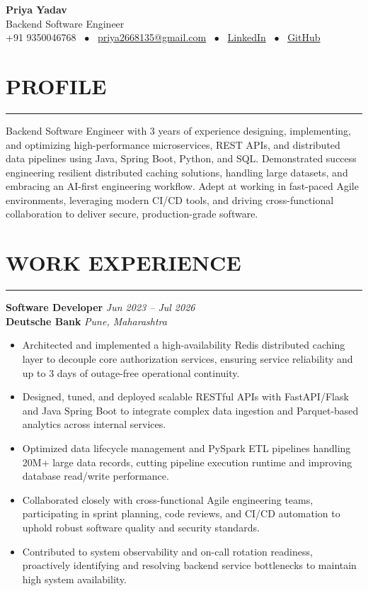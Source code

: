 \documentclass[11pt,letterpaper]{article}
\newcommand{\sectionrule}{\vspace{-6pt}\hrule\vspace{3pt}}
\newcommand{\entryHeader}[4]{%
  \textbf{#1} \hfill \textit{#2}\\
  \textbf{#3} \hfill \textit{#4}
}
\newenvironment{entryList}{%
  \begin{itemize}[leftmargin=1.3em, itemsep=1.5pt, topsep=2pt, parsep=0pt]
}{%
  \end{itemize}\vspace{2pt}
}
\begin{document}
\begin{center}
  {\LARGE \bfseries Priya Yadav} \\[2pt]
  {\normalsize Backend Software Engineer} \\[2pt]
  \small +91 9350046768 ~$\bullet$~
  \href{mailto:priya2668135@gmail.com}{priya2668135@gmail.com} ~$\bullet$~
  \href{https://www.linkedin.com/in/priya-yadav-14a44419a/}{LinkedIn} ~$\bullet$~
  \href{https://github.com/precise-charmerr}{GitHub}
\end{center}

\vspace{2pt}

\section*{PROFILE}
\sectionrule
Backend Software Engineer with 3 years of experience designing, implementing, and optimizing high-performance microservices, REST APIs, and distributed data pipelines using Java, Spring Boot, Python, and SQL. Demonstrated success engineering resilient distributed caching solutions, handling large datasets, and embracing an AI-first engineering workflow. Adept at working in fast-paced Agile environments, leveraging modern CI/CD tools, and driving cross-functional collaboration to deliver secure, production-grade software.

\section*{WORK EXPERIENCE}
\sectionrule

\entryHeader{Software Developer}{Jun 2023 -- Jul 2026}{Deutsche Bank}{Pune, Maharashtra}
\begin{entryList}
  \item Architected and implemented a high-availability Redis distributed caching layer to decouple core authorization services, ensuring service reliability and up to 3 days of outage-free operational continuity.
  \item Designed, tuned, and deployed scalable RESTful APIs with FastAPI/Flask and Java Spring Boot to integrate complex data ingestion and Parquet-based analytics across internal services.
  \item Optimized data lifecycle management and PySpark ETL pipelines handling 20M+ large data records, cutting pipeline execution runtime and improving database read/write performance.
  \item Collaborated closely with cross-functional Agile engineering teams, participating in sprint planning, code reviews, and CI/CD automation to uphold robust software quality and security standards.
  \item Contributed to system observability and on-call rotation readiness, proactively identifying and resolving backend service bottlenecks to maintain high system availability.
\end{entryList}
\end{document}
